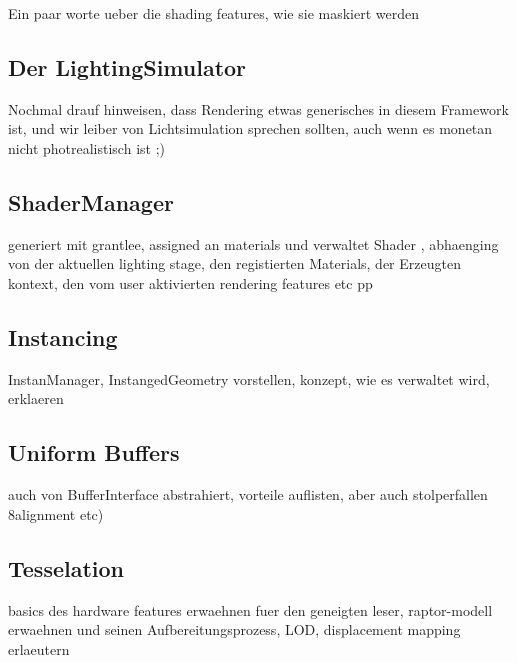 
	Ein paar worte ueber die shading features, wie sie maskiert werden

\subsection{Der LightingSimulator}
	Nochmal drauf hinweisen, dass Rendering etwas generisches in diesem Framework ist, und wir leiber von Lichtsimulation sprechen sollten, auch wenn es monetan nicht photrealistisch ist ;)
	

\subsection{ShaderManager}
	generiert mit grantlee, assigned an materials und verwaltet Shader , abhaenging von der aktuellen lighting stage, den registierten Materials,
	der Erzeugten kontext, den vom user aktivierten rendering features etc pp
	
\subsection{Instancing}
	InstanManager, InstangedGeometry vorstellen, konzept, wie es verwaltet wird, erklaeren
\subsection{Uniform Buffers}
	auch von BufferInterface abstrahiert, vorteile auflisten, aber auch stolperfallen 8alignment etc)
\subsection{Tesselation}
	basics des hardware features erwaehnen fuer den geneigten leser, raptor-modell erwaehnen und seinen Aufbereitungsprozess, LOD, displacement mapping erlaeutern
	
	  

\clearpage
